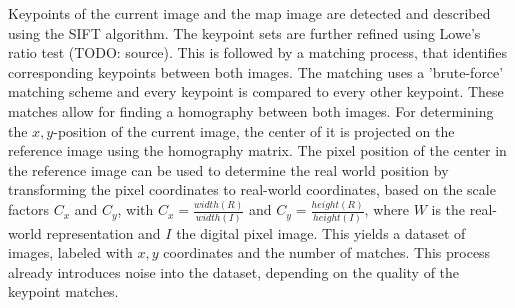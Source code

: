 Keypoints of the current image and the map image are detected and
described using the SIFT algorithm. The keypoint sets are further refined using Lowe's ratio test (TODO: source). This is followed by a matching
process, that identifies corresponding keypoints between both
images. The matching uses a 'brute-force' matching scheme and every keypoint is compared to every other keypoint. These matches allow for finding a homography between both
images. For determining the $x, y$-position of the current image, the
center of it is projected on the reference image using the homography
matrix. The pixel position of the center in the reference image can be
used to determine the real world position by transforming the pixel
coordinates to real-world coordinates, based on the scale factors
$C_x$ and $C_y$, with $C_x = \frac{width(R)}{width(I)}$ and
$C_y = \frac{height(R)}{height(I)}$, where $W$ is the real-world
representation and $I$ the digital pixel image. This yields a dataset
of images, labeled with $x, y$ coordinates and the number of
matches. This process already introduces noise into the dataset, depending on the quality of the keypoint matches.